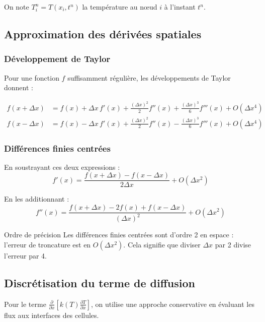 \documentclass[11pt,a4paper]{article}
\begin{document}
On note $T_i^n = T(x_i, t^n)$ la température au nœud $i$ à l'instant $t^n$.

\subsection{Approximation des dérivées spatiales}

\subsubsection{Développement de Taylor}

Pour une fonction $f$ suffisamment régulière, les développements de Taylor donnent :

\begin{align}
f(x+\Delta x) &= f(x) + \Delta x \, f'(x) + \frac{(\Delta x)^2}{2} f''(x) + \frac{(\Delta x)^3}{6} f'''(x) + O(\Delta x^4) \\
f(x-\Delta x) &= f(x) - \Delta x \, f'(x) + \frac{(\Delta x)^2}{2} f''(x) - \frac{(\Delta x)^3}{6} f'''(x) + O(\Delta x^4)
\end{align}

\subsubsection{Différences finies centrées}

En soustrayant ces deux expressions :
\begin{equation}
\boxed{f'(x) = \frac{f(x+\Delta x) - f(x-\Delta x)}{2\Delta x} + O(\Delta x^2)}
\end{equation}

En les additionnant :
\begin{equation}
\boxed{f''(x) = \frac{f(x+\Delta x) - 2f(x) + f(x-\Delta x)}{(\Delta x)^2} + O(\Delta x^2)}
\end{equation}

\begin{remarque}{Ordre de précision}{}
Les différences finies centrées sont d'ordre 2 en espace : l'erreur de troncature est en $O(\Delta x^2)$. Cela signifie que diviser $\Delta x$ par 2 divise l'erreur par 4.
\end{remarque}

\subsection{Discrétisation du terme de diffusion}

Pour le terme $\frac{\partial}{\partial x}\left[k(T) \frac{\partial T}{\partial x}\right]$, on utilise une approche conservative en évaluant les flux aux interfaces des cellules.
\end{document}
